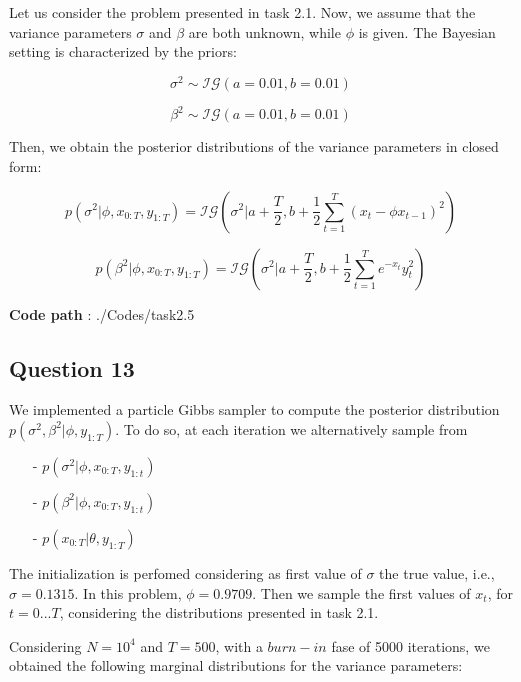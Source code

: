 \documentclass[]{article}
\begin{document}
	Let us consider the problem presented in task 2.1. Now, we assume that the variance parameters $\sigma$ and $\beta$ are both unknown, while $\phi$ is given. The Bayesian setting is characterized by the priors:
	
	$$\sigma^2 \sim \mathcal{IG}(a=0.01, b=0.01)$$
	
	$$\beta^2 \sim \mathcal{IG}(a=0.01, b=0.01)$$
	
	Then, we obtain the posterior distributions of the variance parameters in closed form:
	
	$$ p(\sigma^2|\phi, x_{0:T}, y_{1:T}) = \mathcal{IG}(\sigma^2|a+\frac{T}{2}, b+\frac{1}{2}\sum_{t=1}^{T}(x_t-\phi x_{t-1})^2) $$
	
	$$p(\beta^2|\phi, x_{0:T}, y_{1:T}) = \mathcal{IG}(\sigma^2|a+\frac{T}{2}, b+\frac{1}{2}\sum_{t=1}^{T}e^{-x_t}y_t^2)$$
	
	\textbf{Code path} : ./Codes/task2.5  
	
	\subsection*{Question 13}
	
	We implemented a particle Gibbs sampler to compute the posterior distribution $p(\sigma^2, \beta^2|\phi, y_{1:T})$. To do so, at each iteration we alternatively sample from
	
	\begin{enumerate}
		
		\item[-] $p(\sigma^2|\phi, x_{0:T}, y_{1:t})$
		
		\item[-] $p(\beta^2|\phi, x_{0:T}, y_{1:t})$
		
		\item[-] $p(x_{0:T}|\theta, y_{1:T})$
		
	\end{enumerate}
	
	The initialization is perfomed considering as first value of $\sigma$ the true value, i.e., $\sigma = 0.1315$. In this problem, $\phi = 0.9709$. Then we sample the first values of $x_t$, for $t=0...T$, considering the distributions presented in task 2.1.
	
	
	Considering $N=10^4$ and $T=500$, with a $burn-in$ fase of 5000 iterations, we obtained the following marginal distributions for the variance parameters:
	
\end{document}
